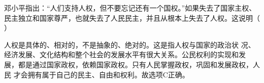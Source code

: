 \question 邓小平指出：``人们支持人权，但不要忘记还有一个国权。''如果失去了国家主权、民主独立和国家尊严，也就失去了人民民主，并且从根本上失去了人权。这说明（
）
\par{}
\begin{solution}人权是具体的、相对的，不是抽象的、绝对的。这是指人权与国家的政治状
况、经济发展、文化结构和整个社会的发展水平有很大关系。公民权利的实现和发
展，都是通过国家政权，依赖国家政权。只有人民掌握政权，巩固和发展政权，人民
才会拥有属于自己的民主、自由和权利。故选项C正确。
\end{solution}
